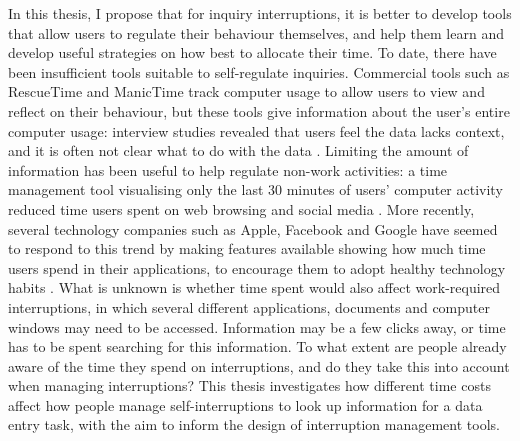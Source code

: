 In this thesis, I propose that for inquiry interruptions, it is better to develop tools that allow users to regulate their behaviour themselves,  and help them learn and develop useful strategies on how best to allocate their time. To date, there have been insufficient tools suitable to self-regulate inquiries. Commercial tools such as RescueTime \citep{RescueTime} and ManicTime \citep{ManicTime} track computer usage to allow users to view and reflect on their behaviour, but these tools give information about the user’s entire computer usage: interview studies revealed that users feel the data lacks context, and it is often not clear what to do with the data \citep{Collins2014}. Limiting the amount of information has been useful to help regulate non-work activities: a time management tool visualising only the last 30 minutes of users' computer activity reduced time users spent on web browsing and social media \citep{Whittaker2016}. More recently, several technology companies such as Apple, Facebook and Google have seemed to respond to this trend by making features available showing how much time users spend in their applications, to encourage them to adopt healthy technology habits \citep{Apple2018, Constine2018, Constine2018a, Lynley2018}. What is unknown is whether time spent would also affect work-required interruptions, in which several different applications, documents and computer windows may need to be accessed. Information may be a few clicks away, or time has to be spent searching for this information. To what extent are people already aware of the time they spend on interruptions, and do they take this into account when managing interruptions? This thesis investigates how different time costs affect how people manage self-interruptions to look up information for a data entry task, with the aim to inform the design of interruption management tools.



